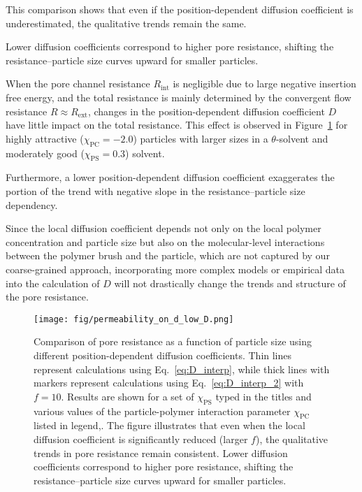 \documentclass[10pt, a4paper]{article}
\begin{document}
\begin{multicols}{2}
This comparison shows that even if the position-dependent diffusion coefficient is underestimated, the qualitative trends remain the same.

Lower diffusion coefficients correspond to higher pore resistance, shifting the resistance–particle size curves upward for smaller particles.

When the pore channel resistance $R_{\text{int}}$ is negligible due to large negative insertion free energy, and the total resistance is mainly determined by the convergent flow resistance $R \approx R_{\text{ext}}$, changes in the position-dependent diffusion coefficient $D$ have little impact on the total resistance. This effect is observed in Figure~\ref{fig:permeability_ond_low_D} for highly attractive ($\chi_{\text{PC}} = -2.0$) particles with larger sizes in a $\theta$-solvent and moderately good ($\chi_{\text{PS}} = 0.3$) solvent.

Furthermore, a lower position-dependent diffusion coefficient exaggerates the portion of the trend with negative slope in the resistance–particle size dependency.

Since the local diffusion coefficient depends not only on the local polymer concentration and particle size but also on the molecular-level interactions between the polymer brush and the particle, which are not captured by our coarse-grained approach, incorporating more complex models or empirical data into the calculation of $D$ will not drastically change the trends and structure of the pore resistance.


\end{multicols}

\begin{figure}[H]
    \centering
    \texttt{[image: fig/permeability\_on\_d\_low\_D.png]}
    \caption{
        Comparison of pore resistance as a function of particle size using different position-dependent diffusion coefficients.
        Thin lines represent calculations using Eq.~\ref{eq:D_interp}, while thick lines with markers represent calculations using Eq.~\ref{eq:D_interp_2} with $f = 10$.
        Results are shown for a set of $\chi_{\text{PS}}$ typed in the titles and various values of the particle-polymer interaction parameter $\chi_{\text{PC}}$ listed in legend,.
        The figure illustrates that even when the local diffusion coefficient is significantly reduced (larger $f$), the qualitative trends in pore resistance remain consistent.
        Lower diffusion coefficients correspond to higher pore resistance, shifting the resistance–particle size curves upward for smaller particles.
        }
    \label{fig:permeability_ond_low_D}
\end{figure}
\end{document}
